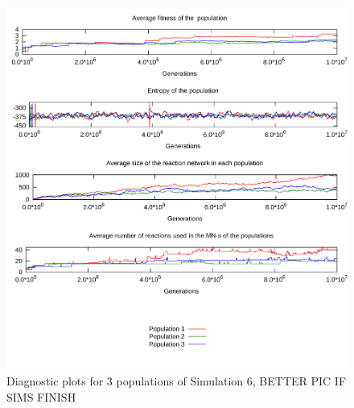 \documentclass[a4paper,12pt]{article}
\begin{document}
\begin{figure}[htpb]
	\centering
	\includegraphics[width=0.8\linewidth]{simulationequalatppyruvate.pdf}
	\caption{Diagnostic plots for 3 populations of Simulation 6, BETTER PIC IF SIMS FINISH}
	\label{fig:simulationequalatppyruvate}
\end{figure}
\end{document}

